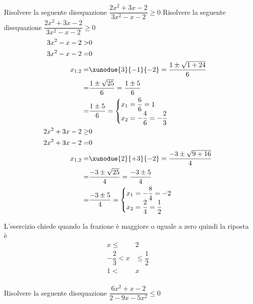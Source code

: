 \begin{exercise}
	Risolvere la seguente disequazione $\dfrac{2x^2+3x-2}{3x^2-x-2}\geq 0$
\tcblower
	Risolvere la seguente disequazione $\dfrac{2x^2+3x-2}{3x^2-x-2}\geq 0$
\begin{align*}
3x^2-x-2>&0\\
3x^2-x-2=&0\\
x_{1,2}=&\xunodue{3}{-1}{-2}=\dfrac{1\pm\sqrt{1+24}}{6}\\
=&\dfrac{1\pm\sqrt{25}}{6}=\dfrac{1\pm 5}{6}\\
=&\dfrac{1\pm 5}{6}=\begin{cases}
x_1=\dfrac{6}{6}=1\\
x_2=-\dfrac{4}{6}=-\dfrac{2}{3}
\end{cases}\\
2x^2+3x-2\geq&0\\
2x^2+3x-2=&0\\
x_{1,2}=&\xunodue{2}{+3}{-2}=\dfrac{-3\pm\sqrt{9+16}}{4}\\
=&\dfrac{-3\pm\sqrt{25}}{4}=\dfrac{-3\pm 5}{4}\\
=&\dfrac{-3\pm 5}{4}=\begin{cases}
x_1=-\dfrac{8}{4}=-2\\
x_2=\dfrac{2}{4}=\dfrac{1}{2}
\end{cases}\\
\end{align*}
\begin{center}
	
\end{center}
L'esercizio chiede quando la frazione è maggiore o uguale a zero quindi la riposta è 
\begin{align*}
x\leq& 2\\ -\dfrac{2}{3}<x&\leq \dfrac{1}{2}\\ 1<&x\\
\end{align*}
\end{exercise}
\begin{exercise}[no solution]
	Risolvere la seguente disequazione $\dfrac{6x^2+x-2}{2-9x-5x^2}\leq 0$
\end{exercise}
